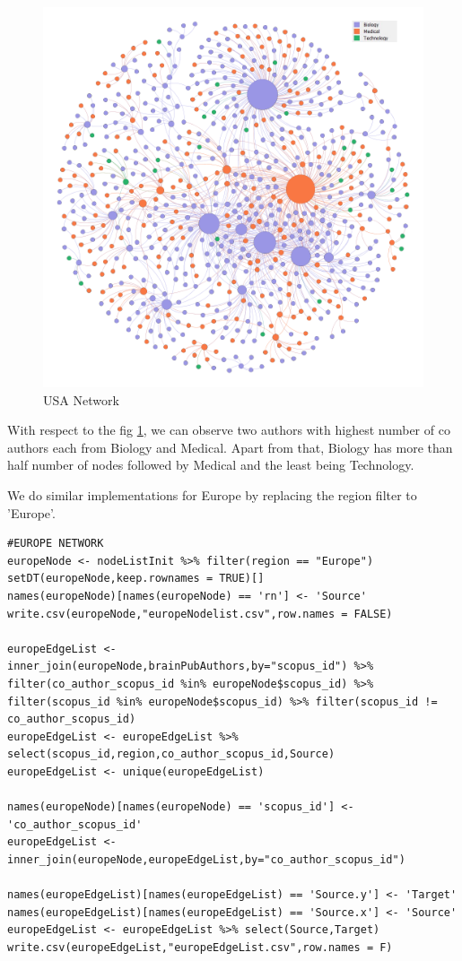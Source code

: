 \documentclass[a4paper,11pt]{article}
\theoremstyle{mytheor}
\begin{document}
\begin{figure}[ht]
    \centering
    \includegraphics[width=15cm]{usanet_legend2.png}
    \caption{USA Network}
    \label{fig:USA Network}
\end{figure}

With respect to the fig \ref{fig:USA Network}, we can observe two authors with highest number of co authors each from Biology and Medical. Apart from that, Biology has more than half number of nodes followed by Medical and the least being Technology.  \newline



We do similar implementations for Europe by replacing the region filter to 'Europe'.   

\begin{lstlisting}
#EUROPE NETWORK
europeNode <- nodeListInit %>% filter(region == "Europe") 
setDT(europeNode,keep.rownames = TRUE)[]
names(europeNode)[names(europeNode) == 'rn'] <- 'Source'
write.csv(europeNode,"europeNodelist.csv",row.names = FALSE)

europeEdgeList <- inner_join(europeNode,brainPubAuthors,by="scopus_id") %>% filter(co_author_scopus_id %in% europeNode$scopus_id) %>% filter(scopus_id %in% europeNode$scopus_id) %>% filter(scopus_id != co_author_scopus_id)
europeEdgeList <- europeEdgeList %>% select(scopus_id,region,co_author_scopus_id,Source)
europeEdgeList <- unique(europeEdgeList)

names(europeNode)[names(europeNode) == 'scopus_id'] <- 'co_author_scopus_id'
europeEdgeList <- inner_join(europeNode,europeEdgeList,by="co_author_scopus_id")

names(europeEdgeList)[names(europeEdgeList) == 'Source.y'] <- 'Target'
names(europeEdgeList)[names(europeEdgeList) == 'Source.x'] <- 'Source'
europeEdgeList <- europeEdgeList %>% select(Source,Target)
write.csv(europeEdgeList,"europeEdgeList.csv",row.names = F)
\end{lstlisting}
\end{document}
